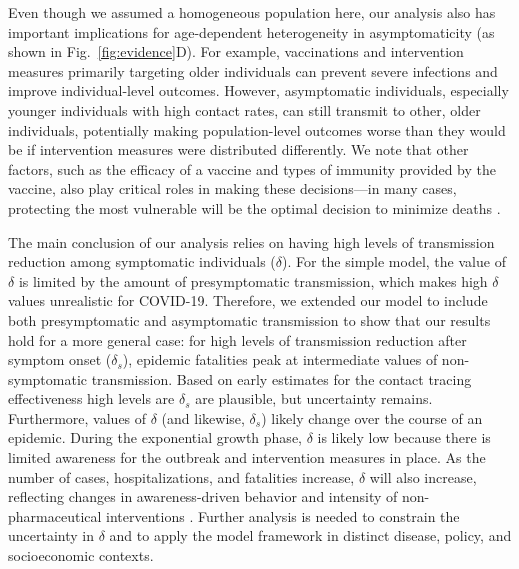 \documentclass[12pt]{article}
\newcommand{\fref}[1]{Fig.~\ref{fig:#1}}
\begin{document}
Even though we assumed a homogeneous population here, our analysis also has important implications for age-dependent heterogeneity in asymptomaticity (as shown in \fref{evidence}D).
For example, vaccinations and intervention measures primarily targeting older individuals can prevent severe infections and improve individual-level outcomes.
However, asymptomatic individuals, especially younger individuals with high contact rates, can still transmit to other, older individuals, potentially making population-level outcomes worse than they would be if intervention measures were distributed differently.
We note that other factors, such as the efficacy of a vaccine and types of immunity provided by the vaccine, also play critical roles in making these decisions---in many cases, protecting the most vulnerable will be the optimal decision to minimize deaths \cite{moore2021modelling}.

The main conclusion of our analysis relies on having high levels of transmission reduction among symptomatic individuals ($\delta$). 
For the simple model, the value of $\delta$ is limited by the amount of presymptomatic transmission, which makes high $\delta$ values unrealistic for COVID-19.
Therefore, we extended our model to include both presymptomatic and asymptomatic transmission to show that our results hold for a more general case: for high levels of transmission reduction after symptom onset ($\delta_s$), epidemic fatalities peak at intermediate values of non-symptomatic transmission.
Based on early estimates for the contact tracing effectiveness \citep{kucharski2020effectiveness} high levels are $\delta_s$ are plausible, but uncertainty remains. 
Furthermore, values of $\delta$ (and likewise, $\delta_s$) likely change over the course of an epidemic.
During the exponential growth phase, $\delta$ is likely low because there is limited awareness for the outbreak and intervention measures in place.
As the number of cases, hospitalizations, and fatalities increase, $\delta$ will also increase, reflecting changes in awareness-driven behavior and intensity of non-pharmaceutical interventions \citep{weitz2020awareness}.
Further analysis is needed to constrain the uncertainty in $\delta$ and to apply the model framework in distinct disease, policy, and socioeconomic contexts. 
\end{document}

